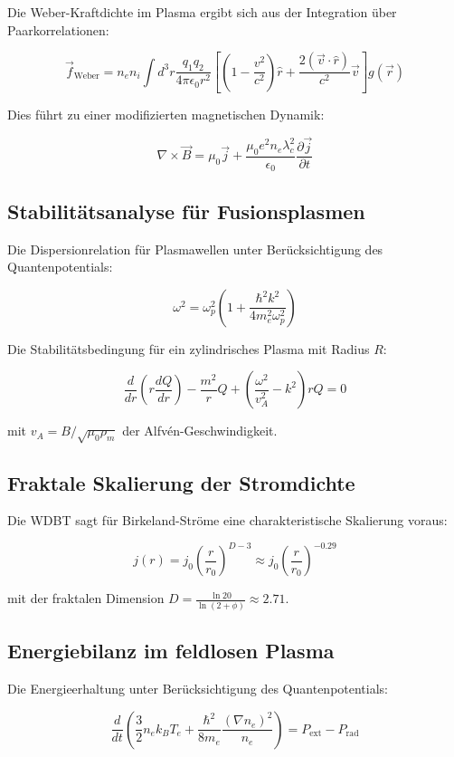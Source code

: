 Die Weber-Kraftdichte im Plasma ergibt sich aus der Integration über Paarkorrelationen:

\begin{equation}
\vec{f}_{\text{Weber}} = n_e n_i \int d^3r \frac{q_1 q_2}{4\pi\epsilon_0 r^2} \left[ \left(1-\frac{v^2}{c^2}\right)\hat{r} + \frac{2(\vec{v}\cdot\hat{r})}{c^2}\vec{v} \right] g(\vec{r})
\end{equation}

Dies führt zu einer modifizierten magnetischen Dynamik:

\begin{equation}
\label{eq:modified_ampere}
\nabla \times \vec{B} = \mu_0 \vec{j} + \frac{\mu_0 e^2 n_e \lambda_c^2}{\epsilon_0} \frac{\partial \vec{j}}{\partial t}
\end{equation}

\subsection{Stabilitätsanalyse für Fusionsplasmen}

Die Dispersionrelation für Plasmawellen unter Berücksichtigung des Quantenpotentials:

\begin{equation}
\label{eq:dispersion}
\omega^2 = \omega_p^2 \left(1 + \frac{\hbar^2 k^2}{4m_e^2 \omega_p^2}\right)
\end{equation}

Die Stabilitätsbedingung für ein zylindrisches Plasma mit Radius $R$:

\begin{equation}
\label{eq:stability}
\frac{d}{dr}\left(r\frac{dQ}{dr}\right) - \frac{m^2}{r}Q + \left(\frac{\omega^2}{v_A^2} - k^2\right)rQ = 0
\end{equation}

mit $v_A = B/\sqrt{\mu_0 \rho_m}$ der Alfvén-Geschwindigkeit.

\subsection{Fraktale Skalierung der Stromdichte}

Die WDBT sagt für Birkeland-Ströme eine charakteristische Skalierung voraus:

\begin{equation}
j(r) = j_0 \left(\frac{r}{r_0}\right)^{D-3} \approx j_0 \left(\frac{r}{r_0}\right)^{-0.29}
\end{equation}

mit der fraktalen Dimension $D = \frac{\ln 20}{\ln(2+\phi)} \approx 2.71$.

\subsection{Energiebilanz im feldlosen Plasma}

Die Energieerhaltung unter Berücksichtigung des Quantenpotentials:

\begin{equation}
\label{eq:energy}
\frac{d}{dt}\left(\frac{3}{2}n_e k_B T_e + \frac{\hbar^2}{8m_e} \frac{(\nabla n_e)^2}{n_e}\right) = P_{\text{ext}} - P_{\text{rad}}
\end{equation}
